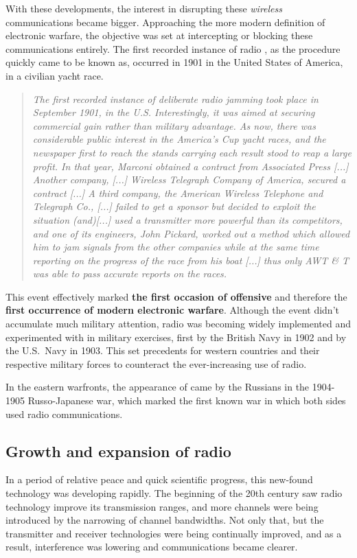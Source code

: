 \documentclass[english,purist]{ist-report}
\begin{document}
With these developments, the interest in disrupting these \textit{wireless} communications became bigger. Approaching the more modern definition of electronic warfare, the objective was set at intercepting or blocking these communications entirely. The first recorded instance of radio \jamming{}, as the procedure quickly came to be known as, occurred in 1901 in the United States of America, in a civilian yacht race.
\begin{quote}\itshape
    The first recorded instance of deliberate radio jamming took place in September 1901, in the U.S. Interestingly, it was aimed at securing commercial gain rather than military advantage. As now, there was considerable public interest in the America’s Cup yacht races, and the newspaper first to reach the stands carrying each result stood to reap a large profit. In that year, Marconi obtained a contract from Associated Press [...] Another company, [...] Wireless Telegraph Company of America, secured a contract [...] A third company, the American Wireless Telephone and Telegraph Co., [...] failed to get a sponsor but decided to exploit the situation (and)[...] used a transmitter more powerful than its competitors, and one of its engineers, John Pickard, worked out a method which allowed him to jam signals from the other companies while at the same time reporting on the progress of the race from his boat [...] thus only AWT \& T was able to pass accurate reports on the races. \cite{alican2006}
\end{quote}
This event effectively marked \textbf{the first occasion of offensive \jamming{}} and therefore the \textbf{first occurrence of modern electronic warfare}. Although the event didn't accumulate much military attention, radio \jamming{} was becoming widely implemented and experimented with in military exercises, first by the British Navy in 1902 and by the U.S.\ Navy in 1903. This set precedents for western countries and their respective military forces to counteract the ever-increasing use of radio.

In the eastern warfronts, the appearance of \jamming{} came by the Russians in the 1904-1905 Russo-Japanese war, which marked the first known war in which both sides used radio communications.

\subsection{Growth and expansion of radio}

In a period of relative peace and quick scientific progress, this new-found technology was developing rapidly. The beginning of the 20th century saw radio technology improve its transmission ranges, and more channels were being introduced by the narrowing of channel bandwidths. Not only that, but the transmitter and receiver technologies were being continually improved, and as a result, interference was lowering and communications became clearer.
\end{document}

